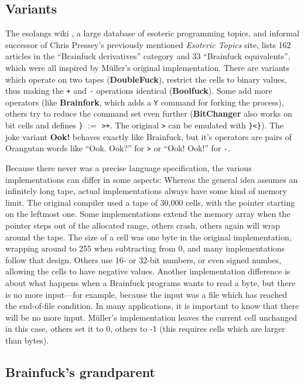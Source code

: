 \subsection{Variants}
\label{sec:brainfuck_variants}

The esolangs wiki \cite{esolang}, a large database of esoteric programming topics, and informal successor of Chris Pressey's previously mentioned \emph{Esoteric Topics} site, lists 162 articles in the “Brainfuck derivatives” category and 33 “Brainfuck equivalents”, which were all inspired by Müller's original implementation. There are variants which operate on two tapes (\textbf{DoubleFuck}), restrict the cells to binary values, thus making the \texttt{+} and \texttt{-} operations identical (\textbf{Boolfuck}). Some add more operators (like \textbf{Brainfork}, which adds a \texttt{Y} command for forking the process), others try to reduce the command set even further (\textbf{BitChanger} also works on bit cells and defines \texttt{\}} $:=$ \texttt{>+}. The original \texttt{>} can be emulated with \texttt{\}<\}}).
The joke variant \textbf{Ook!} behaves exactly like Brainfuck, but it's operators are pairs of Orangutan words like “Ook. Ook?” for \texttt{>} or “Ook! Ook!” for \texttt{-}.

Because there never was a precise language specification, the various implementations can differ in some aspects:
Whereas the general idea assumes an infinitely long tape, actual implementations always have some kind of memory limit. The original compiler used a tape of 30,000 cells, with the pointer starting on the leftmost one. Some implementations extend the memory array when the pointer steps out of the allocated range, others crash, others again will wrap around the tape.
The size of a cell was one byte in the original implementation, wrapping around to 255 when subtracting from 0, and many implementations follow that design. Others use 16- or 32-bit numbers, or even signed numbes, allowing the cells to have negative values.
Another implementation difference is about what happens when a Brainfuck programs wants to read a byte, but there is no more input---for example, because the input was a file which has reached the end-of-file condition. In many applications, it is important to know that there will be no more input. Müller's implementation leaves the current cell unchanged in this case, others set it to 0, others to -1 (this requires cells which are larger than bytes).

\subsection{Brainfuck's grandparent}
\label{pprimeprime}

